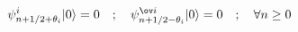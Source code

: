 \begin{equation}
\psi^i_{n+1/2+\theta_i}|0\rangle = 0 \quad ; \quad
\psi^{\ov i}_{n+1/2-\theta_i}|0\rangle = 0 \quad ; \quad \forall n\geq 0
\end{equation}

